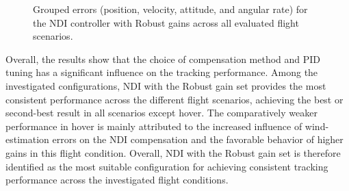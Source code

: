 \begin{figure}[htbp]
	\begin{subfigure}[b]{0.48\linewidth}
		\centering
	\end{subfigure}
	\hfill
	\begin{subfigure}[b]{0.48\linewidth}
		\centering
	\end{subfigure}
	
	\caption{Grouped errors (position, velocity, attitude, and angular rate) for the NDI controller with Robust gains across all evaluated flight scenarios.}
	\label{fig:ndi_robust_grouped_rmse}
\end{figure}

Overall, the results show that the choice of compensation method and PID tuning has a significant influence on the tracking performance. Among the investigated configurations, NDI with the Robust gain set provides the most consistent performance across the different flight scenarios, achieving the best or second-best result in all scenarios except hover. The comparatively weaker performance in hover is mainly attributed to the increased influence of wind-estimation errors on the NDI compensation and the favorable behavior of higher gains in this flight condition. Overall, NDI with the Robust gain set is therefore identified as the most suitable configuration for achieving consistent tracking performance across the investigated flight conditions.


